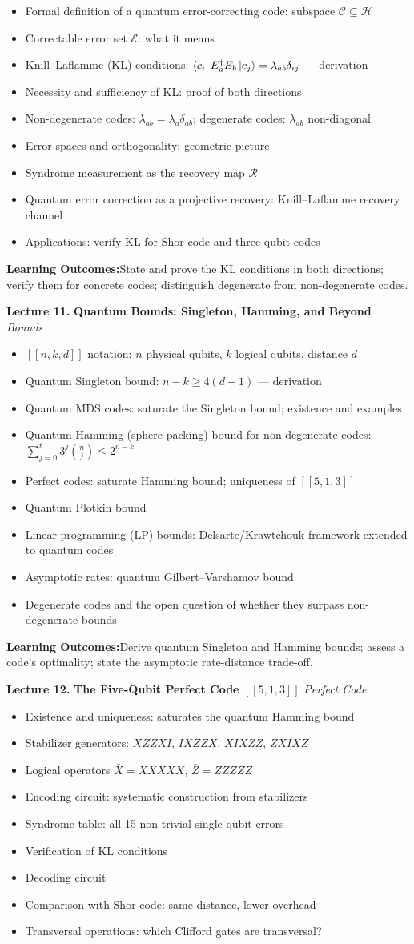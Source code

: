\documentclass[12pt,oneside]{article}
\newcommand{\lecturetitle}[3]{%
  \vspace{10pt}
  \begin{tcolorbox}[
    enhanced,breakable,
    colback=highlight,colframe=accent,
    arc=2pt,left=10pt,right=8pt,top=7pt,bottom=7pt,boxrule=0.7pt
  ]
    \textbf{\color{accent}Lecture #1.\enspace}%
    {\color{primary}\bfseries #2}%
    \hfill{\small\color{warmgold}\textit{#3}}
  \end{tcolorbox}
  \vspace{-2pt}
}
\newcommand{\topics}[1]{%
  \begin{itemize}[leftmargin=1.5em,itemsep=1.5pt,topsep=3pt,parsep=0pt]
    #1
  \end{itemize}\vspace{2pt}
}
\newcommand{\T}[1]{\item #1}
\newcommand{\keybox}[1]{%
  \begin{tcolorbox}[
    enhanced,colback=lightgray,colframe=rulegray,
    arc=2pt,left=8pt,right=8pt,top=5pt,bottom=5pt,boxrule=0.4pt,
    fontupper=\small
  ]
    \textbf{\color{primary}Learning Outcomes:\enspace}#1
  \end{tcolorbox}\vspace{4pt}
}
\begin{document}
\topics{
  \T{Formal definition of a quantum error-correcting code: subspace $\mathcal{C}\subseteq\mathcal{H}$}
  \T{Correctable error set $\mathcal{E}$: what it means}
  \T{Knill--Laflamme (KL) conditions: $\bra{c_i}E_a^\dagger E_b\ket{c_j}=\lambda_{ab}\delta_{ij}$ --- derivation}
  \T{Necessity and sufficiency of KL: proof of both directions}
  \T{Non-degenerate codes: $\lambda_{ab}=\lambda_a\delta_{ab}$; degenerate codes: $\lambda_{ab}$ non-diagonal}
  \T{Error spaces and orthogonality: geometric picture}
  \T{Syndrome measurement as the recovery map $\mathcal{R}$}
  \T{Quantum error correction as a projective recovery: Knill--Laflamme recovery channel}
  \T{Applications: verify KL for Shor code and three-qubit codes}
}

\keybox{State and prove the KL conditions in both directions; verify them for concrete codes; distinguish degenerate from non-degenerate codes.}

\lecturetitle{11}{Quantum Bounds: Singleton, Hamming, and Beyond}{Bounds}

\topics{
  \T{$[[n,k,d]]$ notation: $n$ physical qubits, $k$ logical qubits, distance $d$}
  \T{Quantum Singleton bound: $n - k \geq 4(d-1)$ --- derivation}
  \T{Quantum MDS codes: saturate the Singleton bound; existence and examples}
  \T{Quantum Hamming (sphere-packing) bound for non-degenerate codes: $\sum_{j=0}^{t}3^j\binom{n}{j}\leq 2^{n-k}$}
  \T{Perfect codes: saturate Hamming bound; uniqueness of $[[5,1,3]]$}
  \T{Quantum Plotkin bound}
  \T{Linear programming (LP) bounds: Delsarte/Krawtchouk framework extended to quantum codes}
  \T{Asymptotic rates: quantum Gilbert--Varshamov bound}
  \T{Degenerate codes and the open question of whether they surpass non-degenerate bounds}
}

\keybox{Derive quantum Singleton and Hamming bounds; assess a code's optimality; state the asymptotic rate-distance trade-off.}

\lecturetitle{12}{The Five-Qubit Perfect Code $[[5,1,3]]$}{Perfect Code}

\topics{
  \T{Existence and uniqueness: saturates the quantum Hamming bound}
  \T{Stabilizer generators: $XZZXI$, $IXZZX$, $XIXZZ$, $ZXIXZ$}
  \T{Logical operators $\bar{X}=XXXXX$, $\bar{Z}=ZZZZZ$}
  \T{Encoding circuit: systematic construction from stabilizers}
  \T{Syndrome table: all 15 non-trivial single-qubit errors}
  \T{Verification of KL conditions}
  \T{Decoding circuit}
  \T{Comparison with Shor code: same distance, lower overhead}
  \T{Transversal operations: which Clifford gates are transversal?}
}
\end{document}
